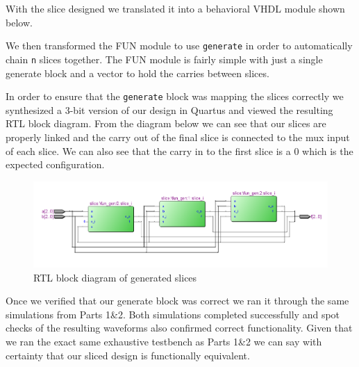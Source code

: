 \documentclass{article}
\begin{document}
\newpage
With the slice designed we translated it into a behavioral VHDL module shown below.



We then transformed the FUN module to use \texttt{generate} in order to
automatically chain \texttt{n} slices together. The FUN module is fairly simple
with just a single generate block and a vector to hold the carries between
slices.



In order to ensure that the \texttt{generate} block was mapping the slices
correctly we synthesized a 3-bit version of our design in Quartus and viewed
the resulting RTL block diagram. From the diagram below we can see that our
slices are properly linked and the carry out of the final slice is connected to
the mux input of each slice. We can also see that the carry in to the first slice
is a 0 which is the expected configuration.

\begin{figure}[H]
    \centering
    \includegraphics[width=\linewidth]{../part_2/fun_3_rtl.png}
    \caption{RTL block diagram of generated slices}
\end{figure}

\newpage
Once we verified that our generate block was correct we ran it through the same
simulations from Parts 1\&2. Both simulations completed successfully and spot
checks of the resulting waveforms also confirmed correct functionality. Given
that we ran the exact same exhaustive testbench as Parts 1\&2 we can say with
certainty that our sliced design is functionally equivalent.
\end{document}
